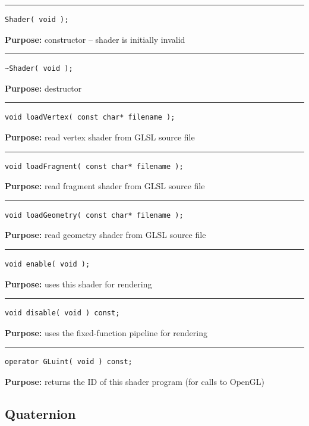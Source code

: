 \documentclass{article}
\begin{document}
\rule{5in}{1pt}
\begin{verbatim}
Shader( void );
\end{verbatim}
\textbf{Purpose:}
constructor -- shader is initially invalid

\hspace{-.21in}\rule{5in}{1pt}
\begin{verbatim}
~Shader( void );
\end{verbatim}
\textbf{Purpose:}
destructor

\hspace{-.21in}\rule{5in}{1pt}
\begin{verbatim}
void loadVertex( const char* filename );
\end{verbatim}
\textbf{Purpose:}
read vertex shader from GLSL source file

\hspace{-.21in}\rule{5in}{1pt}
\begin{verbatim}
void loadFragment( const char* filename );
\end{verbatim}
\textbf{Purpose:}
read fragment shader from GLSL source file

\hspace{-.21in}\rule{5in}{1pt}
\begin{verbatim}
void loadGeometry( const char* filename );
\end{verbatim}
\textbf{Purpose:}
read geometry shader from GLSL source file

\hspace{-.21in}\rule{5in}{1pt}
\begin{verbatim}
void enable( void );
\end{verbatim}
\textbf{Purpose:}
uses this shader for rendering

\hspace{-.21in}\rule{5in}{1pt}
\begin{verbatim}
void disable( void ) const;
\end{verbatim}
\textbf{Purpose:}
uses the fixed-function pipeline for rendering

\hspace{-.21in}\rule{5in}{1pt}
\begin{verbatim}
operator GLuint( void ) const;
\end{verbatim}
\textbf{Purpose:}
returns the ID of this shader program (for calls to OpenGL)


\pagebreak\subsection{Quaternion}
\end{document}

